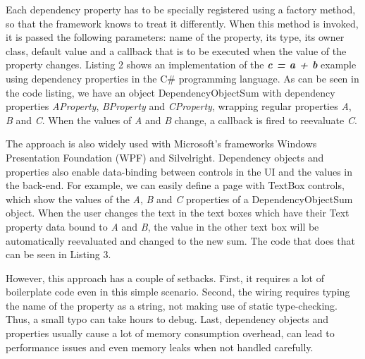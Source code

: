 \documentclass{sigplanconf}
\begin{document}
Each dependency property has to be specially registered using a factory method, so that the framework knows to treat it differently. When this method is invoked, it is passed the following parameters: name of the property, its type, its owner class, default value and a callback that is to be executed when the value of the property changes. Listing 2 shows an implementation of the \textit{\textbf{c = a + b}} example using dependency properties in the C\# programming language. As can be seen in the code listing, we have an object DependencyObjectSum with dependency properties \textit{AProperty},\textit{ BProperty} and \textit{CProperty}, wrapping regular properties \textit{A}, \textit{B} and \textit{C}. When the values of \textit{A} and \textit{B} change, a callback is fired to reevaluate \textit{C}. 

The approach is also widely used with Microsoft's frameworks Windows Presentation Foundation (WPF) and Silvelright. Dependency objects and properties also enable data-binding between controls in the UI and the values in the back-end. For example, we can easily define a page with TextBox controls, which show the values of the \textit{A}, \textit{B} and \textit{C} properties of a DependencyObjectSum object. When the user changes the text in the text boxes which have their Text property data bound to \textit{A} and \textit{B}, the value in the other text box will be automatically reevaluated and changed to the new sum. The code that does that can be seen in Listing 3. 

However, this approach has a couple of setbacks. First, it requires a lot of boilerplate code even in this simple scenario. Second, the wiring requires typing the name of the property as a string, not making use of static type-checking. Thus, a small typo can take hours to debug. Last, dependency objects and properties usually cause a lot of memory consumption overhead, can lead to performance issues and even memory leaks when not handled carefully.
\end{document}
